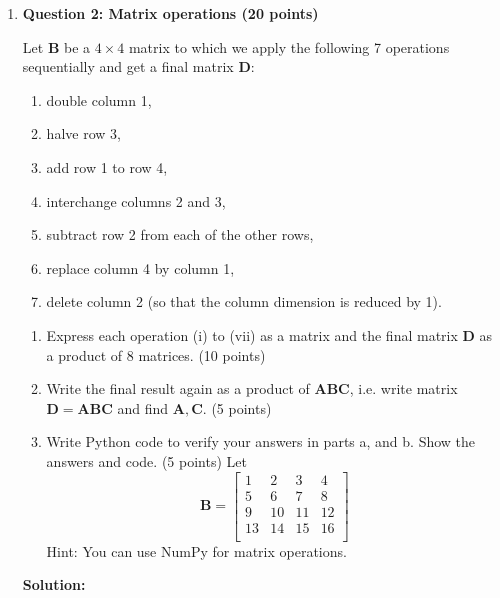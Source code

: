 \documentclass[11pt,letterpaper]{article}
\begin{document}
\begin{enumerate}
\clearpage
\item[] \textbf{Question 2: Matrix operations (20 points)} 

Let $\mathbf{B}$ be a $4\times 4$ matrix to which we apply the following 7 operations sequentially and get a final matrix $\mathbf{D}$:
\begin{enumerate}[label=(\roman*),align=left]
    \item double column 1,
    \item halve row 3,
    \item add row 1 to row 4,
    \item interchange columns 2 and 3,
    \item subtract row 2 from each of the other rows,
    \item replace column 4 by column 1,
    \item delete column 2 (so that the column dimension is reduced by 1).
\end{enumerate}
\begin{enumerate}
    \item Express each operation (i) to (vii) as a matrix and  the final matrix $\mathbf{D}$ as a product of 8 matrices. (10 points)
    \item Write the final result again as a product of $\mathbf{ABC}$, i.e. write matrix $\mathbf{D} = \mathbf{ABC}$ and find $\mathbf{A},\mathbf{C}$. (5 points)
    \item Write Python code to verify your answers in parts a, and b. Show the answers and code. (5 points)
    Let
    \[
     \mathbf{B} = \begin{bmatrix}
        1 & 2 & 3 & 4\\
        5 & 6 & 7 & 8\\
        9 & 10 & 11 & 12\\
        13 & 14 & 15 & 16\\
    \end{bmatrix}
    \]
    Hint: You can use NumPy for matrix operations. 
\end{enumerate}

\textbf{Solution:}


\end{enumerate}
\end{document}
